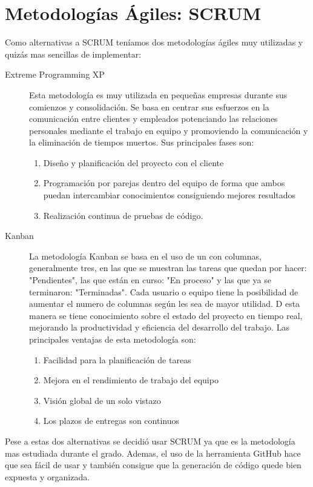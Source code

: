 \section{Metodologías Ágiles: SCRUM}\label{sec:ARMetodologiasAgiles}

Como alternativas a SCRUM teníamos dos metodologías ágiles muy utilizadas y quizás mas sencillas de implementar:

\begin{description}
\item[Extreme Programming XP]
Esta metodología es muy utilizada en pequeñas empresas durante sus comienzos y consolidación. Se basa en centrar sus esfuerzos en la comunicación entre clientes y empleados potenciando las relaciones personales mediante el trabajo en equipo y promoviendo la comunicación y la eliminación de tiempos muertos.
Sus principales fases son:
\begin{enumerate}
\item Diseño y planificación del proyecto con el cliente
\item Programación por parejas dentro del equipo de forma que ambos puedan intercambiar conocimientos consiguiendo mejores resultados
\item Realización continua de pruebas de código.
\end{enumerate}

\item[Kanban] 
La metodología Kanban se basa en el uso de un  con columnas, generalmente tres, en las que se muestran las tareas que quedan por hacer: "Pendientes", las que están en curso: "En proceso" y las que ya se terminaron: "Terminadas". Cada usuario o equipo tiene la posibilidad de aumentar el numero de columnas según les sea de mayor utilidad. D esta manera se tiene conocimiento sobre el estado del proyecto en tiempo real, mejorando la productividad y eficiencia del desarrollo del trabajo.
Las principales ventajas de esta metodología son:
\begin{enumerate}
\item Facilidad para la planificación de tareas
\item Mejora en el rendimiento de trabajo del equipo
\item Visión global de un solo vistazo
\item Los plazos de entregas son continuos
\end{enumerate}
\end{description}

Pese a estas dos alternativas se decidió usar SCRUM ya que es la metodología mas estudiada durante el grado. Ademas, el uso de la herramienta GitHub hace que sea fácil de usar y también consigue que la generación de código quede bien expuesta y organizada.

